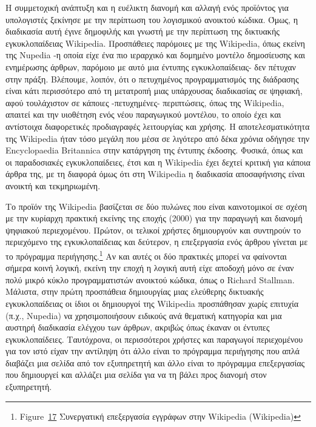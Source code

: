 \documentclass[
]{article}
\begin{document}
Η συμμετοχική ανάπτυξη και η ευέλικτη διανομή και αλλαγή ενός προϊόντος
για υπολογιστές ξεκίνησε με την περίπτωση του λογισμικού ανοικτού
κώδικα. Όμως, η διαδικασία αυτή έγινε δημοφιλής και γνωστή με την
περίπτωση της δικτυακής εγκυκλοπαίδειας Wikipedia. Προσπάθειες παρόμοιες
με της Wikipedia, όπως εκείνη της Nupedia -η οποία είχε ένα πιο
ιεραρχικό και δομημένο μοντέλο δημοσίευσης και ενημέρωσης άρθρων,
παρόμοιο με αυτό μια έντυπης εγκυκλοπαίδειας- δεν πέτυχαν στην πράξη.
Βλέπουμε, λοιπόν, ότι ο πετυχημένος προγραμματισμός της διάδρασης είναι
κάτι περισσότερο από τη μετατροπή μιας υπάρχουσας διαδικασίας σε
ψηφιακή, αφού τουλάχιστον σε κάποιες -πετυχημένες- περιπτώσεις, όπως της
Wikipedia, απαιτεί και την υιοθέτηση ενός νέου παραγωγικού μοντέλου, το
οποίο έχει και αντίστοιχα διαφορετικές προδιαγραφές λειτουργίας και
χρήσης. Η αποτελεσματικότητα της Wikipedia ήταν τόσο μεγάλη που μέσα σε
λιγότερο από δέκα χρόνια οδήγησε την Encyclopaedia Britannica στην
κατάργηση της έντυπης έκδοσης. Φυσικά, όπως και οι παραδοσιακές
εγκυκλοπαίδειες, έτσι και η Wikipedia έχει δεχτεί κριτική για κάποια
άρθρα της, με τη διαφορά όμως ότι στη Wikipedia η διαδικασία
αποσαφήνισης είναι ανοικτή και τεκμηριωμένη.

Το προϊόν της Wikipedia βασίζεται σε δύο πυλώνες που είναι καινοτομικοί
σε σχέση με την κυρίαρχη πρακτική εκείνης της εποχής (2000) για την
παραγωγή και διανομή ψηφιακού περιεχομένου. Πρώτον, οι τελικοί χρήστες
δημιουργούν και συντηρούν το περιεχόμενο της εγκυκλοπαίδειας και
δεύτερον, η επεξεργασία ενός άρθρου γίνεται με το πρόγραμμα
περιήγησης.\footnote{Figure~\protect\hyperlink{fig:wikipedia-edit}{17}
  Συνεργατική επεξεργασία εγγράφων στην Wikipedia (Wikipedia)} Αν και
αυτές οι δύο πρακτικές μπορεί να φαίνονται σήμερα κοινή λογική, εκείνη
την εποχή η λογική αυτή είχε αποδοχή μόνο σε έναν πολύ μικρό κύκλο
προγραμματιστών ανοικτού κώδικα, όπως ο Richard Stallman. Μάλιστα, στην
πρώτη προσπάθεια δημιουργίας μιας ελεύθερης δικτυακής εγκυκλοπαίδειας οι
ίδιοι οι δημιουργοί της Wikipedia προσπάθησαν χωρίς επιτυχία (π.χ.,
Nupedia) να χρησιμοποιήσουν ειδικούς ανά θεματική κατηγορία και μια
αυστηρή διαδικασία ελέγχου των άρθρων, ακριβώς όπως έκαναν οι έντυπες
εγκυκλοπαίδειες. Ταυτόχρονα, οι περισσότεροι χρήστες και παραγωγοί
περιεχομένου για τον ιστό είχαν την αντίληψη ότι άλλο είναι το πρόγραμμα
περιήγησης που απλά διαβάζει μια σελίδα από τον εξυπηρετητή και άλλο
είναι το πρόγραμμα επεξεργασίας που δημιουργεί και αλλάζει μια σελίδα
για να τη βάλει προς διανομή στον εξυπηρετητή.
\end{document}
